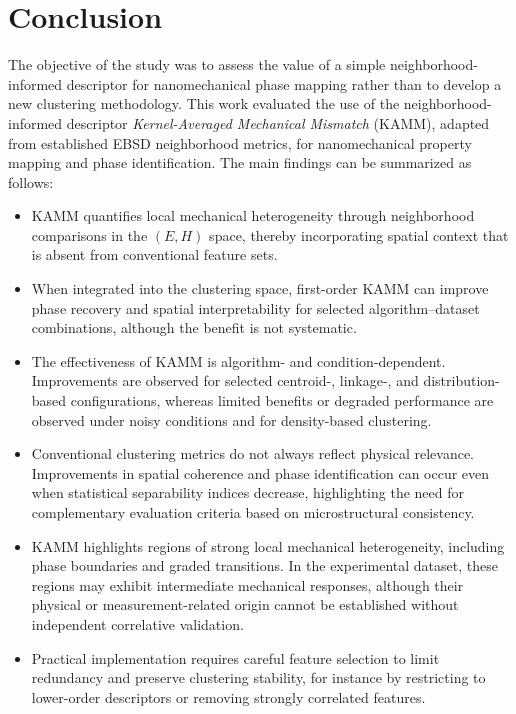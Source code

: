 \documentclass[final,3p,times]{elsarticle}
\begin{document}
\section{Conclusion}
\label{sec:conclusion}

The objective of the study was to assess the value of a simple neighborhood-informed descriptor for nanomechanical phase mapping rather than to develop a new clustering methodology. This work evaluated the use of the neighborhood-informed descriptor \textit{Kernel-Averaged Mechanical Mismatch} (KAMM), adapted from established EBSD neighborhood metrics, for nanomechanical property mapping and phase identification. The main findings can be summarized as follows:

\begin{itemize}
    \item KAMM quantifies local mechanical heterogeneity through neighborhood comparisons in the \((E,H)\) space, thereby incorporating spatial context that is absent from conventional feature sets.
    
    \item When integrated into the clustering space, first-order KAMM can improve phase recovery and spatial interpretability for selected algorithm--dataset combinations, although the benefit is not systematic.
    
    \item The effectiveness of KAMM is algorithm- and condition-dependent. Improvements are observed for selected centroid-, linkage-, and distribution-based configurations, whereas limited benefits or degraded performance are observed under noisy conditions and for density-based clustering.
    
    \item Conventional clustering metrics do not always reflect physical relevance. Improvements in spatial coherence and phase identification can occur even when statistical separability indices decrease, highlighting the need for complementary evaluation criteria based on microstructural consistency.
    
    \item KAMM highlights regions of strong local mechanical heterogeneity, including phase boundaries and graded transitions. In the experimental dataset, these regions may exhibit intermediate mechanical responses, although their physical or measurement-related origin cannot be established without independent correlative validation.
    
    \item Practical implementation requires careful feature selection to limit redundancy and preserve clustering stability, for instance by restricting to lower-order descriptors or removing strongly correlated features.
\end{itemize}
\end{document}

